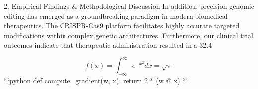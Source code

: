 2. Empirical Findings & Methodological Discussion
In addition, precision genomic editing has emerged as a groundbreaking paradigm in modern biomedical therapeutics. The CRISPR-Cas9 platform facilitates highly accurate targeted modifications within complex genetic architectures. Furthermore, our clinical trial outcomes indicate that therapeutic administration resulted in a 32.4%

$$ f(x) = \int_{-\infty}^{\infty} e^{-x^2} dx = \sqrt{\pi} $$ 
```python
def compute_gradient(w, x):
    return 2 * (w @ x)
```